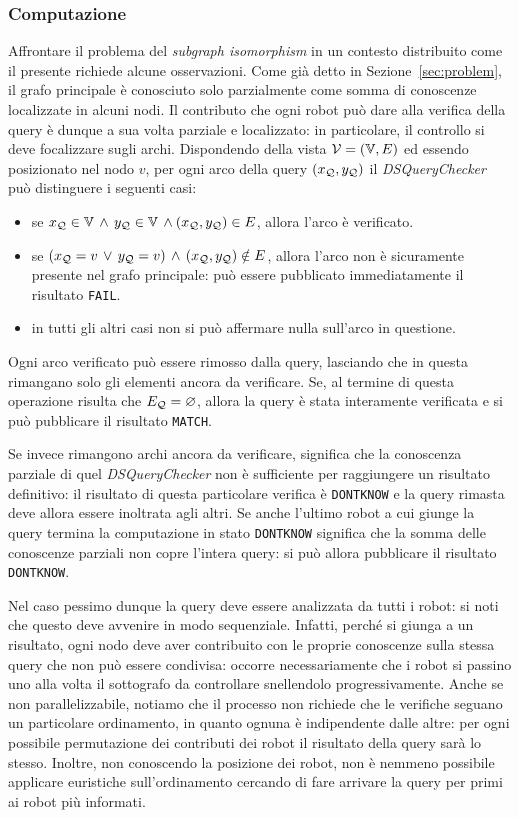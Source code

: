 \subsubsection*{Computazione}
Affrontare il problema del \emph{subgraph isomorphism} in un
contesto distribuito come il presente richiede alcune osservazioni.
Come già detto in Sezione~\ref{sec:problem}, il grafo principale
è conosciuto solo parzialmente come somma di conoscenze localizzate
in alcuni nodi.
Il contributo che ogni robot può dare alla verifica della query
è dunque a sua volta parziale e localizzato: in particolare,
il controllo si deve focalizzare sugli archi.
Dispondendo della vista $\mathcal{V} = (\mathbb{V}, E)$ ed essendo posizionato
nel nodo $v$, per ogni arco della query $(x_{\mathcal{Q}}, y_{\mathcal{Q}})$
il \emph{DSQueryChecker} può distinguere i seguenti casi:
\begin{itemize}
\item se \(x_{\mathcal{Q}} \in \mathbb{V}\,\wedge\,y_{\mathcal{Q}} \in \mathbb{V}\,
  \wedge (x_{\mathcal{Q}}, y_{\mathcal{Q}}) \in E\), allora l'arco è verificato.
\item se \((x_{\mathcal{Q}} = v\,\vee\,y_{\mathcal{Q}} = v)\,
  \wedge\,(x_{\mathcal{Q}}, y_{\mathcal{Q}}) \notin E\),
  allora l'arco non è sicuramente presente nel grafo principale:
  può essere pubblicato immediatamente il risultato \texttt{FAIL}.
\item in tutti gli altri casi non si può affermare nulla
  sull'arco in questione.
\end{itemize}
%
Ogni arco verificato può essere rimosso dalla query, lasciando
che in questa rimangano solo gli elementi ancora da verificare.
Se, al termine di questa operazione risulta che $E_{\mathcal{Q}} = \varnothing$,
allora la query è stata interamente verificata e si può
pubblicare il risultato \texttt{MATCH}.

Se invece rimangono archi ancora da verificare, significa che
la conoscenza parziale di quel \emph{DSQueryChecker} non è
sufficiente per raggiungere un risultato definitivo:
il risultato di questa particolare verifica è \texttt{DONTKNOW}
e la query rimasta deve allora essere inoltrata agli altri.
Se anche l'ultimo robot a cui giunge la query termina la
computazione in stato \texttt{DONTKNOW} significa che la somma
delle conoscenze parziali non copre l'intera query: si può
allora pubblicare il risultato \texttt{DONTKNOW}.

Nel caso pessimo dunque la query deve essere analizzata da tutti
i robot: si noti che questo deve avvenire in modo sequenziale.
Infatti, perché si giunga a un risultato, ogni nodo deve aver
contribuito con le proprie conoscenze sulla stessa query che
non può essere condivisa: occorre necessariamente che i robot
si passino uno alla volta il sottografo da controllare
snellendolo progressivamente. Anche se non parallelizzabile,
notiamo che il processo non richiede che le verifiche seguano
un particolare ordinamento, in quanto ognuna è indipendente
dalle altre: per ogni possibile permutazione dei contributi dei
robot il risultato della query sarà lo stesso.
Inoltre, non conoscendo la posizione dei robot, non è nemmeno
possibile applicare euristiche sull'ordinamento cercando
di fare arrivare la query per primi ai robot più informati.

